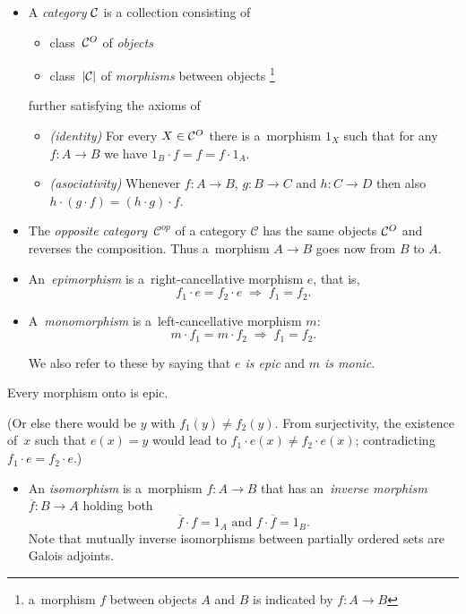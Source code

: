 \begin{itemize}
\item A \emph{category} $\mathcal{C}$ is a collection consisting of
  \begin{itemize}
  \item class~$\mathcal{C}^O$ of \emph{objects\/}
  \item class~$|\mathcal{C}|$ of \emph{morphisms\/} between objects\thinspace%
  \footnote{a~morphism $f$ between objects $A$ and $B$ is indicated by $f\colon
    A \to B$}
  \end{itemize}
further satisfying the axioms of
  \begin{itemize}
  \item \emph{(identity)\/}
  For every $X\in \mathcal{C}^O$ there is a~morphism $1_X$ such that for any $f\colon
  A \to B$ we have $1_B \cdot f = f = f \cdot 1_A$.
  \item \emph{(asociativity)\/}
  Whenever $f\colon A \to B$, $g\colon B \to C$ and $h\colon C \to D$ then also $h
  \cdot (g \cdot f) = (h \cdot g) \cdot f$.
  \end{itemize}

\item The \emph{opposite category}~$\mathcal{C}^{op}$ of a category
$\mathcal{C}$ has the same objects $\mathcal{C}^O$ and reverses the composition.
Thus a~morphism $A \to B$ goes now from $B$ to $A$.

\item An~\emph{epimorphism} is a~right-cancellative morphism $e$, that is,
\[
  f_1 \cdot e = f_2 \cdot e \; \Longrightarrow \; f_1 = f_2.
\]

\item A~\emph{monomorphism} is a~left-cancellative morphism $m$:
\[
  m \cdot f_1 = m \cdot f_2 \; \Longrightarrow \; f_1 = f_2.
\]

We also refer to these by saying that \emph{$e$ is epic\/} and \emph{$m$ is
monic\/}.
\end{itemize}

\begin{fact} \label{fct:onto->epic}
  Every morphism onto is epic.
\end{fact}
(Or else there would be $y$ with $f_1(y) \ne f_2(y)$.
 From surjectivity, the existence of~$x$ such that $e(x) = y$ would lead to
 $f_1 \cdot e(x) \ne f_2 \cdot e(x)$; contradicting $f_1 \cdot e = f_2 \cdot
 e$.)

\begin{itemize}
\item An \emph{isomorphism} is a~morphism $f\colon A \to B$ that has
an~\emph{inverse morphism\/} $\overline{f}\colon B \to A$ holding both
\[
  \overline{f} \cdot f = 1_A \text{ and } f \cdot \overline{f} = 1_B.
\]
Note that mutually inverse isomorphisms between partially ordered sets are
Galois adjoints.
\end{itemize}


